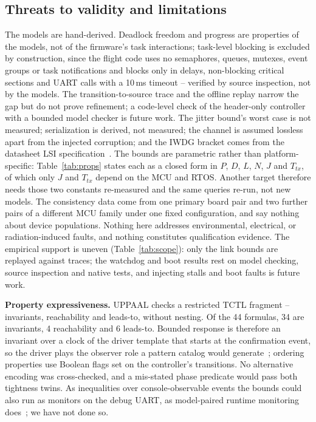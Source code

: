 \documentclass[conference,a4paper]{IEEEtran}
\begin{document}
\subsection{Threats to validity and limitations}
The models are hand-derived. Deadlock freedom and progress are properties of the models, not of the firmware's task interactions; task-level blocking is excluded by construction, since the flight code uses no semaphores, queues, mutexes, event groups or task notifications and blocks only in delays, non-blocking critical sections and UART calls with a 10\,ms timeout -- verified by source inspection, not by the models. The transition-to-source trace and the offline replay narrow the gap but do not prove refinement; a code-level check of the header-only controller with a bounded model checker is future work. The jitter bound's worst case is not measured; serialization is derived, not measured; the channel is assumed lossless apart from the injected corruption; and the IWDG bracket comes from the datasheet LSI specification~\cite{st2021ds12589}. The bounds are parametric rather than platform-specific: Table~\ref{tab:props} states each as a closed form in $P$, $D$, $L$, $N$, $J$ and $T_{tx}$, of which only $J$ and $T_{tx}$ depend on the MCU and RTOS. Another target therefore needs those two constants re-measured and the same queries re-run, not new models. The consistency data come from one primary board pair and two further pairs of a different MCU family under one fixed configuration, and say nothing about device populations. Nothing here addresses environmental, electrical, or radiation-induced faults, and nothing constitutes qualification evidence. The empirical support is uneven (Table~\ref{tab:scope}): only the link bounds are replayed against traces; the watchdog and boot results rest on model checking, source inspection and native tests, and injecting stalls and boot faults is future work.

\textbf{Property expressiveness.} UPPAAL checks a restricted TCTL fragment -- invariants, reachability and leads-to, without nesting. Of the 44 formulas, 34 are invariants, 4 reachability and 6 leads-to. Bounded response is therefore an invariant over a clock of the driver template that starts at the confirmation event, so the driver plays the observer role a pattern catalog would generate~\cite{vogel2023}; ordering properties use Boolean flags set on the controller's transitions. No alternative encoding was cross-checked, and a mis-stated phase predicate would pass both tightness twins. As inequalities over console-observable events the bounds could also run as monitors on the debug UART, as model-paired runtime monitoring does~\cite{zilio2023,cho2025}; we have not done so.
\end{document}
